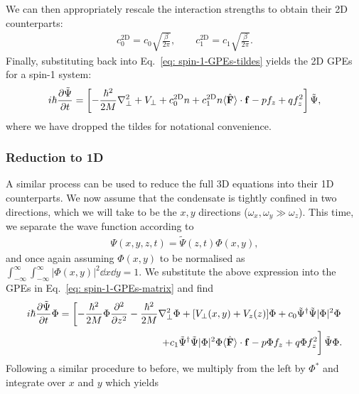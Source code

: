 We can then appropriately rescale the interaction strengths to obtain their 2D
counterparts:
\begin{align}
    c_0^\text{2D} = c_0\sqrt{\frac{\beta}{2\pi}}, \qquad
    c_1^\text{2D} = c_1\sqrt{\frac{\beta}{2\pi}}.
\end{align}
Finally, substituting back into Eq.~\eqref{eq: spin-1-GPEs-tildes} yields the
2D GPEs for a spin-1 system:
\begin{align}
    i\hbar\pdv{\tilde{\Psi}}{t} = \left[-\frac{\hbar^2}{2M}\nabla_\perp^2 + V_\perp
    + c_0^\text{2D}n + c_1^\text{2D}n\langle\hat{\vb{F}}\rangle \cdot
    \vb{f} - pf_z + qf_z^2\right]\tilde{\Psi},
\end{align}
where we have dropped the tildes for notational convenience.

\subsubsection{Reduction to 1D}
A similar process can be used to reduce the full 3D equations into their 1D
counterparts.
We now assume that the condensate is tightly confined in two directions, which
we will take to be the \(x, y\) directions (\(\omega_x, \omega_y \gg
\omega_z\)).
This time, we separate the wave function according to
\begin{align}
    \Psi(x, y, z, t) = \tilde{\Psi}(z, t)\Phi(x, y),
\end{align}
and once again assuming \(\Phi(x, y)\) to be normalised as
\(\int_{-\infty}^{\infty} \int_{-\infty}^{\infty} |\Phi(x, y)|^2 \dd x \dd y
= 1\).
We substitute the above expression into the GPEs in
Eq.~\eqref{eq: spin-1-GPEs-matrix} and find
\begin{equation}
\begin{split}
    i\hbar\pdv{\tilde{\Psi}}{t}\Phi = \left[
        -\frac{\hbar^2}{2M}\Phi\pdv[2]{}{z}
        - \frac{\hbar^2}{2M}\nabla_\perp^2\Phi + [V_\perp(x, y) + V_z(z)]\Phi
        +c_0\tilde{\Psi}^\dagger\tilde{\Psi}|\Phi|^2\Phi\right. \\
        \left.+c_1\tilde{\Psi}^\dagger\tilde{\Psi}|\Phi|^2\Phi
        \langle\hat{\vb{F}}\rangle \cdot \vb{f}
        - p\Phi f_z + q\Phi f_z^2 \vphantom{\int_1^2}\right]\tilde{\Psi}\Phi.
\end{split}
\end{equation}
Following a similar procedure to before, we multiply from the left by \(\Phi^*\)
and integrate over \(x\) and \(y\) which yields
